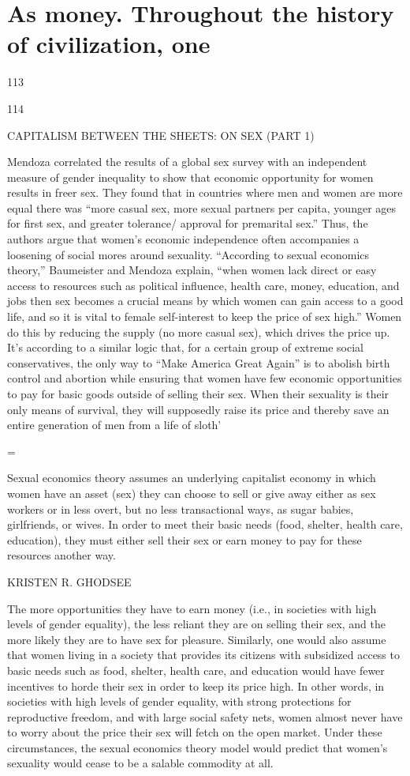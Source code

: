 \section{As money. Throughout the history of civilization, one}
 \par 
113
 \par 
114
 \par 
CAPITALISM BETWEEN THE SHEETS: ON SEX (PART {\color{blue}1})
 \par 
Mendoza correlated the results of a global sex survey with an independent measure of gender inequality to show that economic opportunity for women results in freer sex. They found that in countries where men and women are more equal there was “more casual sex, more sexual partners per capita, younger ages for first sex, and greater tolerance/ approval for premarital sex.” Thus, the authors argue that women’s economic independence often accompanies a loosening of social mores around sexuality. “According to sexual economics theory,” Baumeister and Mendoza explain, “when women lack direct or easy access to resources such as political influence, health care, money, education, and jobs then sex becomes a crucial means by which women can gain access to a good life, and so it is vital to female self-interest to keep the price of sex high.” Women do this by reducing the supply (no more casual sex), which drives the price up. It’s according to a similar logic that, for a certain group of extreme social conservatives, the only way to “Make America Great Again” is to abolish birth control and abortion while ensuring that women have few economic opportunities to pay for basic goods outside of selling their sex. When their sexuality is their only means of survival, they will supposedly raise its price and thereby save an entire generation of men from a life of sloth’
 \par 
=~
 \par 
Sexual economics theory assumes an underlying capitalist economy in which women have an asset (sex) they can choose to sell or give away either as sex workers or in less overt, but no less transactional ways, as sugar babies, girlfriends, or wives. In order to meet their basic needs (food, shelter, health care, education), they must either sell their sex or earn money to pay for these resources another way.
 \par 
KRISTEN R. GHODSEE
 \par 
The more opportunities they have to earn money (i.e., in societies with high levels of gender equality), the less reliant they are on selling their sex, and the more likely they are to have sex for pleasure. Similarly, one would also assume that women living in a society that provides its citizens with subsidized access to basic needs such as food, shelter, health care, and education would have fewer incentives to horde their sex in order to keep its price high. In other words, in societies with high levels of gender equality, with strong protections for reproductive freedom, and with large social safety nets, women almost never have to worry about the price their sex will fetch on the open market. Under these circumstances, the sexual economics theory model would predict that women’s sexuality would cease to be a salable commodity at all.
